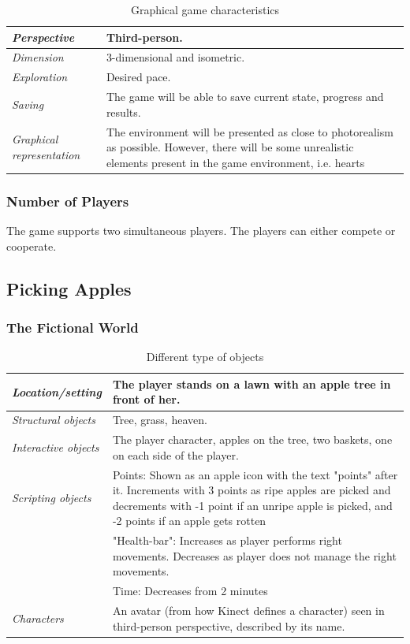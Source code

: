 \begin{table} [H]
\centering
\begin{tabular}{|p{}|p{}|}
\hline
\emph {Perspective} & Third-person. \\ \hline
\emph{Dimension} &  3-dimensional and isometric. \\ \hline
\emph{Exploration} & Desired pace. \\ \hline
\emph{Saving} & The game will be able to save current state, progress and results. \\ \hline
\emph{Graphical representation} & The environment will be presented as close to photorealism as possible.  However, there will be some unrealistic elements present in the game environment, i.e. hearts  \\ \hline
\end{tabular}
\caption[Graphical game characteristics]{Graphical game characteristics}
\label{tab:graphical1}
\end{table}  

\subsubsection{Number of Players}
The game supports two simultaneous players. The players can either compete or cooperate.

\subsection{Picking Apples}

\subsubsection{The Fictional World} 

\begin{table} [H]
\centering
\begin{tabular}{|p{}|p{}|}
\hline
\emph{Location/setting} & The player stands on a lawn with an apple tree in front of her. \\ \hline
\emph{Structural objects} & Tree, grass, heaven.  \\ \hline
\emph{Interactive objects} & The player character, apples on the tree, two baskets, one on each side of the player. \\ \hline
\emph{Scripting objects} &  Points: Shown as an apple icon with the text "points" after it. Increments with 3 points as ripe apples are picked and decrements with -1 point if an unripe apple is picked, and -2 points if an apple gets rotten \\ \cline{2-2}
& "Health-bar": Increases as player performs right  movements. Decreases as player does not manage the right  movements.  \\ \cline{2-2}
& Time: Decreases from 2 minutes \\ \hline
\emph{Characters} & An avatar (from how Kinect defines a character) seen in third-person perspective, described by its name. \\ \hline
\end{tabular}
\caption[Various objects in the "Picking Apples" game]{Different type of objects}
\label{tab:objects2}
\end{table}  
 
